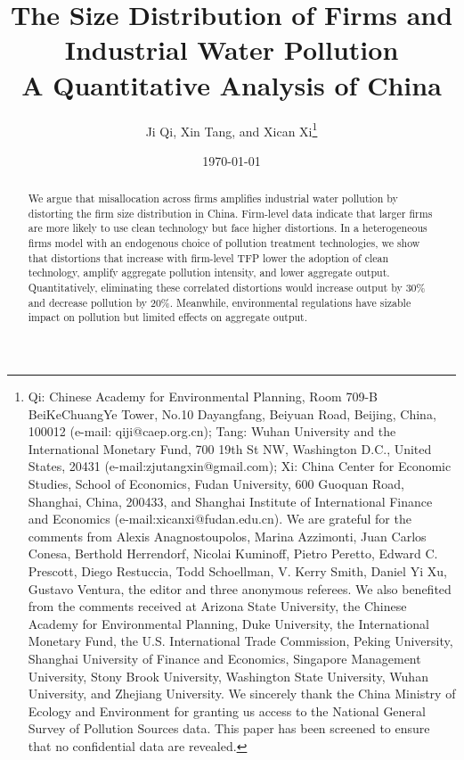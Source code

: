 \documentclass[AEJ]{AEA}
\begin{document}
\title{The Size Distribution of Firms and Industrial Water Pollution \\ A Quantitative Analysis of China}
\author{Ji Qi, Xin Tang, and Xican Xi\thanks{%
Qi: Chinese Academy for Environmental Planning, Room 709-B BeiKeChuangYe Tower, No.10 Dayangfang, Beiyuan Road, Beijing, China, 100012 (e-mail: qiji@caep.org.cn); Tang: Wuhan University and the International Monetary Fund, 700 19th St NW, Washington D.C., United States, 20431 (e-mail:zjutangxin@gmail.com); Xi: China Center for Economic Studies, School of Economics, Fudan University, 600 Guoquan Road, Shanghai, China, 200433, and  Shanghai Institute of International Finance and Economics (e-mail:xicanxi@fudan.edu.cn). We are grateful for the comments from Alexis Anagnostoupolos, Marina Azzimonti, Juan Carlos Conesa, Berthold Herrendorf, Nicolai Kuminoff, Pietro Peretto, Edward C. Prescott, Diego Restuccia, Todd Schoellman, V. Kerry Smith, Daniel Yi Xu, Gustavo Ventura, the editor and three anonymous referees. We also benefited from the comments received at Arizona State University, the Chinese Academy for Environmental Planning, Duke University, the International Monetary Fund, the U.S. International Trade Commission, Peking University, Shanghai University of Finance and Economics, Singapore Management University, Stony Brook University, Washington State University, Wuhan University, and Zhejiang University. We sincerely thank the China Ministry of Ecology and Environment for granting us access to the National General Survey of Pollution Sources data. This paper has been screened to ensure that no confidential data are revealed.}}
\date{\today}

\begin{abstract}
    We argue that misallocation across firms amplifies industrial water pollution by distorting the firm size distribution in China. Firm-level data indicate that larger firms are more likely to use clean technology but face higher distortions. In a heterogeneous firms model with an endogenous choice of pollution treatment technologies, we show that distortions that increase with firm-level TFP lower the adoption of clean technology, amplify aggregate pollution intensity, and lower aggregate output. Quantitatively, eliminating these correlated distortions would increase output by 30\% and decrease pollution by 20\%. Meanwhile, environmental regulations have sizable impact on pollution but limited effects on aggregate output.
\end{abstract}
\end{document}
